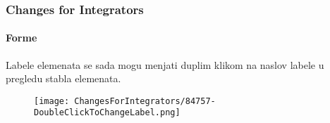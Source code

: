 
\begin{frame}[fragile]
	\frametitle{Changes for Integrators}
	\framesubtitle{Forme}

	\lstset{basicstyle=\tiny\ttfamily}

	Labele elemenata se sada mogu menjati duplim klikom na naslov labele u
	pregledu stabla elemenata.

	\begin{figure}
		\texttt{[image: ChangesForIntegrators/84757-DoubleClickToChangeLabel.png]}
	\end{figure}

\end{frame}


